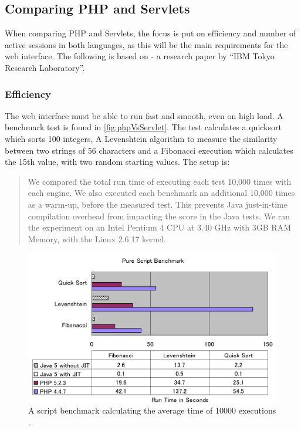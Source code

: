 \subsection*{Comparing PHP and Servlets}
When comparing PHP and Servlets, the focus is put on efficiency and number of active sessions in both languages, as this will be the main requirements for the web interface. The following is based on \cite{servletVsPHP} - a research paper by ``IBM Tokyo Research Laboratory''.

\subsubsection*{Efficiency}
The web interface must be able to run fast and smooth, even on high load. A benchmark test is found in \autoref{fig:phpVsServlet}. The test calculates a quicksort which sorts 100 integers, A Levenshtein algorithm to measure the similarity between two strings of 56
characters and a Fibonacci execution which calculates the 15th value, with two random starting values. The setup is:

\begin{quotation}
We compared the total run time of
executing each test 10,000 times with each engine. We also executed each benchmark
an additional 10,000 times as a warm-up, before the measured test. This prevents
Java just-in-time compilation overhead from impacting the score in the Java tests.
We ran the experiment on an Intel Pentium 4 CPU at 3.40 GHz with 3GB RAM
Memory, with the Linux 2.6.17 kernel. \cite[p. 167]{servletVsPHP}
\end{quotation}

\begin{figure}[htbp]
	\centering
		\includegraphics[width=1.00\textwidth]{images/phpVsServlet.png}
	\caption{A script benchmark calculating the average time of 10000 executions \cite{servletVsPHP}.}
	\label{fig:phpVsServlet}
\end{figure}


